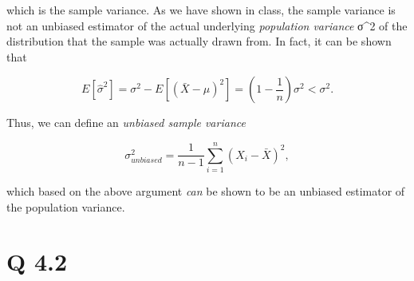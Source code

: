 \documentclass[11pt]{article}
\begin{document}
which is the sample variance. As we have shown in class, the sample
variance is not an unbiased estimator of the actual underlying
\emph{population variance} σ\^{}2 of the distribution that the sample
was actually drawn from. In fact, it can be shown that

\[ E\left[ \hat{σ}^2 \right]= σ^2- E\left[ ( \bar{X} - μ )^2  \right] = \left(1-\frac{1}{n} \right) σ^2 < σ^2. \]

Thus, we can define an \emph{unbiased sample variance}

\[σ_{unbiased}^2=\frac{1}{n-1} \sum_{i=1}^{n} (X_i-\bar{X})^2, \]

which based on the above argument \emph{can} be shown to be an unbiased
estimator of the population variance.

    \section{Q 4.2}\label{q-4.2}
\end{document}
